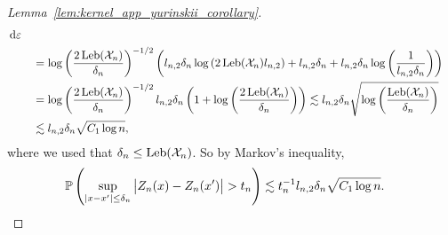 \begin{proof}[Lemma~\ref{lem:kernel_app_yurinskii_corollary}]
\begin{align*}
    \diff{\varepsilon} \\
    &\quad=
    \log \left(\frac{2\Leb(\cX_n)}{\delta_n} \right)^{-1/2}
    \left(
      l_{n,2} \delta_n \log \left( 2 \Leb(\cX_n) l_{n,2} \right)
      + l_{n,2} \delta_n
      + l_{n,2} \delta_n \log \left( \frac{1}{l_{n,2} \delta_n} \right)
    \right) \\
    &\quad=
    \log \left(\frac{2\Leb(\cX_n)}{\delta_n} \right)^{-1/2}
    l_{n,2} \delta_n
    \left(
      1 +
      \log \left( \frac{2\Leb(\cX_n)}{\delta_n} \right)
    \right)
    \lesssim
    l_{n,2} \delta_n
    \sqrt{\log \left( \frac{\Leb(\cX_n)}{\delta_n} \right)} \\
    &\quad\lesssim
    l_{n,2} \delta_n
    \sqrt{C_1 \log n},
  \end{align*}
  where we used that $\delta_n \leq \Leb(\cX_n)$.
  So by Markov's inequality,
  \begin{align*}
    \P\left(
      \sup_{|x - x'| \leq \delta_n}
      \big|
      Z_n(x) - Z_n(x')
      \big|
      > t_n
    \right)
    &\lesssim
    t_n^{-1}
    l_{n,2} \delta_n
    \sqrt{C_1 \log n}.
  \end{align*}



\end{proof}
